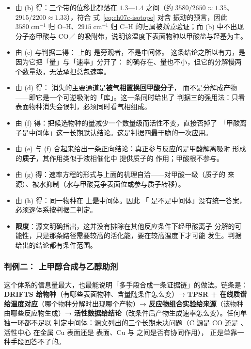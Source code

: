 \begin{infer}
\begin{itemize}
  \item 由 (b) 得：三个带的位移比都落在 $1.3$—$1.4$ 之间（约
        $3580/2650\approx1.35$、$2915/2200\approx1.33$），符合
        式~\eqref{eq:ch07c-isotope} 对含  振动的预言，因此
        $3580\;\mathrm{cm^{-1}}$ 归 O--H、$2915\;\mathrm{cm^{-1}}$ 归 C--H
        的归属被\emph{独立}验证；而 (b) 中不出现分子态甲酸与 CO／
        的吸附带，说明该温度下表面物种以甲酸盐与羟基为主。
  \item 由 (c) 与判据二得： 上的  是旁观者，不是中间体。
        这条结论之所以有力，是因为它把「量」与「速率」分开了：
        的确存在、量也不小，但它的分解慢两个数量级，无法承担总包速率。
  \item 由 (d) 得： 消失的主要通道是\textbf{被气相置换回甲酸分子}，
        而不是分解成产物——即它是一个可逆吸附的「库」。这一条同时给出了
        判据三的强用法：只看表面物种消失会误判，必须同时看气相组成。
  \item 由 (f) 得：把候选物种的量减少一个数量级而活性不变，直接否掉了
        「甲酸离子是中间体」这一长期默认结论。这是判据四最干脆的一次应用。
  \item 由 (e) 与 (f) 合起来给出一条正向结论：真正参与反应的是甲酸解离吸附
        形成的\textbf{质子}，其作用类似于液相催化中  提供质子的
        作用；甲酸根不参与。
  \item 由 (g) 得：速率方程的形式与上面的机理自洽——对甲酸一级（质子的
        来源）、被水抑制（水与甲酸竞争表面位或参与质子转移）。
  \item 由 (h) 得：同一物种在  上\textbf{是}中间体。因此
        「 是不是中间体」没有统一答案，必须逐体系按判据二判定。
  \item \textbf{限度}：源文明确指出，这并没有排除在其他反应条件下经甲酸离子
        分解的可能性，只是那条路径需要较高的活化能，要在较高温度下才可能
        发生。判据给出的结论都有条件范围。
\end{itemize}
\end{infer}

\subsubsection{判例二： 上甲醇合成与乙醇助剂}

\begin{dataflow}
这个体系的信息量最大，也最能说明「多手段合成一条证据链」的做法。链条是：
\textbf{DRIFTS 给物种}（有哪些表面物种、含量随条件怎么变）→
\textbf{TPSR + 在线质谱给温度对应}（哪个物种分解时出现哪个产物）→
\textbf{反应物组合实验给来源}（该物种由哪些反应物生成）→
\textbf{活性数据给结论}（改条件后产物生成速率怎么变）。任何单独一环都不足以
判定中间体：源文列出的三个长期未决问题（C 源是 CO 还是 、活性中心
在金属 Cu 表面还是  表面、Cu 与  之间是否有协同作用），
正是单靠一种手段回答不了的。
\end{dataflow}

